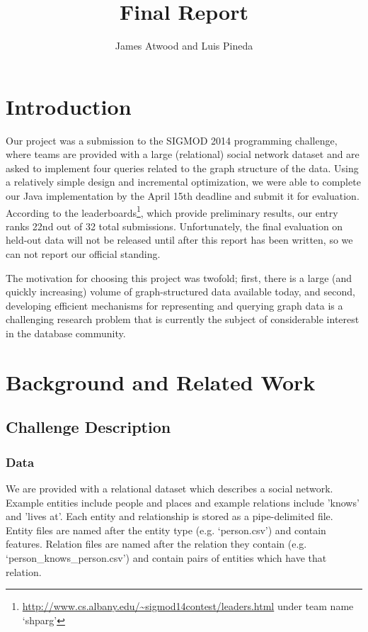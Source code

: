 \documentclass{article}
\title{Final Report}
\author{
James Atwood and Luis Pineda \\ %
}
\begin{document}
\maketitle

\section{Introduction}
Our project was a submission to the SIGMOD 2014 programming challenge,
where teams are provided with a large (relational) social network
dataset and are asked to implement four queries related to the graph
structure of the data.  Using a relatively simple design and
incremental optimization, we were able to complete our Java
implementation by the April 15th deadline and submit it for
evaluation.  According to the
leaderboards\footnote{\url{http://www.cs.albany.edu/~sigmod14contest/leaders.html} under team name `shparg'},
which provide preliminary results, our entry ranks 22nd out of 32
total submissions.  Unfortunately, the final evaluation on held-out
data will not be released until after this report has been written, so
we can not report our official standing.

The motivation for choosing this project was
twofold; first, there is a large (and quickly increasing) volume of
graph-structured data available today, and second, developing
efficient mechanisms for representing and querying graph data is a
challenging research problem that is currently the subject of
considerable interest in the database community.

\section{Background and Related Work}
\subsection{Challenge Description}

\subsubsection{Data}
We are provided with a relational dataset which describes a social
network.  Example entities include people and places and example
relations include 'knows' and 'lives at'.  Each entity and
relationship is stored as a pipe-delimited file.  Entity files are
named after the entity type (e.g. `person.csv') and contain features.
Relation files are named after the relation they contain
(e.g. `person\_knows\_person.csv') and contain pairs of entities which
have that relation.
\end{document}
